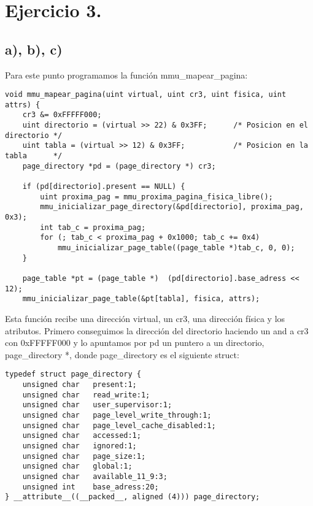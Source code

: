 \section{Ejercicio 3.}
\subsection*{a), b), c)}
\noindent Para este punto programamos la función mmu\_mapear\_pagina:
\begin{codesnippet}
\begin{verbatim}
void mmu_mapear_pagina(uint virtual, uint cr3, uint fisica, uint attrs) {
    cr3 &= 0xFFFFF000;
    uint directorio = (virtual >> 22) & 0x3FF;      /* Posicion en el directorio */
    uint tabla = (virtual >> 12) & 0x3FF;           /* Posicion en la tabla      */
    page_directory *pd = (page_directory *) cr3;

    if (pd[directorio].present == NULL) {
        uint proxima_pag = mmu_proxima_pagina_fisica_libre();
        mmu_inicializar_page_directory(&pd[directorio], proxima_pag, 0x3);
        int tab_c = proxima_pag;
        for (; tab_c < proxima_pag + 0x1000; tab_c += 0x4)
            mmu_inicializar_page_table((page_table *)tab_c, 0, 0);
    }

    page_table *pt = (page_table *)  (pd[directorio].base_adress << 12);                  
    mmu_inicializar_page_table(&pt[tabla], fisica, attrs);
\end{verbatim}
\end{codesnippet}

\noindent Esta función recibe una dirección virtual, un cr3, una dirección física y los atributos. Primero conseguimos la dirección del directorio haciendo un and a cr3 con 0xFFFFF000 y lo apuntamos por pd un puntero a un directorio, page\_directory *, donde page\_directory es el siguiente struct:

\begin{codesnippet}
\begin{verbatim}
typedef struct page_directory {
    unsigned char   present:1;
    unsigned char   read_write:1;
    unsigned char   user_supervisor:1;
    unsigned char   page_level_write_through:1;
    unsigned char   page_level_cache_disabled:1;
    unsigned char   accessed:1;
    unsigned char   ignored:1;
    unsigned char   page_size:1;
    unsigned char   global:1;
    unsigned char   available_11_9:3;
    unsigned int    base_adress:20;
} __attribute__((__packed__, aligned (4))) page_directory;
\end{verbatim}
\end{codesnippet}

